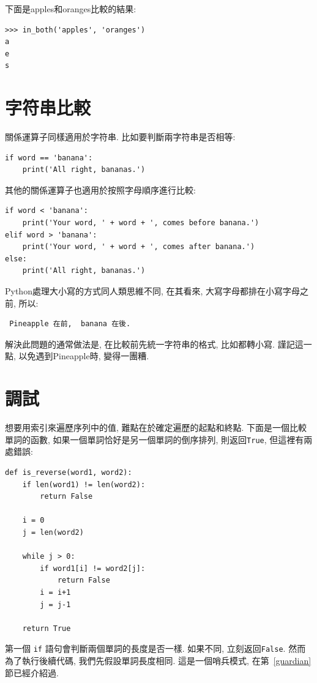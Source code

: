 \documentclass[10pt]{book}
\begin{document}
下面是apples和oranges比較的結果:

\begin{verbatim}
>>> in_both('apples', 'oranges')
a
e
s
\end{verbatim}
%

\section{字符串比較}

關係運算子同樣適用於字符串. 
比如要判斷兩字符串是否相等:

\begin{verbatim}
if word == 'banana':
    print('All right, bananas.')
\end{verbatim}
%

其他的關係運算子也適用於按照字母順序進行比較:

\begin{verbatim}
if word < 'banana':
    print('Your word, ' + word + ', comes before banana.')
elif word > 'banana':
    print('Your word, ' + word + ', comes after banana.')
else:
    print('All right, bananas.')
\end{verbatim}
%
Python處理大小寫的方式同人類思維不同, 在其看來, 大寫字母都排在小寫字母之前, 
所以:

\begin{verbatim}
 Pineapple 在前,  banana 在後.
\end{verbatim}
%
解決此問題的通常做法是, 在比較前先統一字符串的格式, 比如都轉小寫. 
謹記這一點, 以免遇到Pineapple時, 變得一團糟. 


\section{調試}

想要用索引來遍歷序列中的值, 難點在於確定遍歷的起點和終點. 
下面是一個比較單詞的函數, 如果一個單詞恰好是另一個單詞的倒序排列, 
則返回{\tt True}, 但這裡有兩處錯誤:

\begin{verbatim}
def is_reverse(word1, word2):
    if len(word1) != len(word2):
        return False
    
    i = 0
    j = len(word2)

    while j > 0:
        if word1[i] != word2[j]:
            return False
        i = i+1
        j = j-1

    return True
\end{verbatim}
%
第一個 {\tt if} 語句會判斷兩個單詞的長度是否一樣. 
如果不同, 立刻返回{\tt False}. 
然而為了執行後續代碼, 我們先假設單詞長度相同. 
這是一個哨兵模式, 在第~\ref{guardian}節已經介紹過. 
\end{document}
